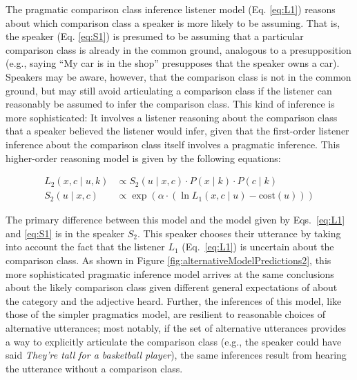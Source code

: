 \documentclass[doc]{apa6}
\begin{document}
The pragmatic comparison class inference listener model (Eq. \ref{eq:L1}) reasons about which comparison class a speaker is more likely to be assuming.
That is, the speaker (Eq. \ref{eq:S1}) is presumed to be assuming that a particular comparison class is already in the common ground, analogous to a presupposition (e.g., saying ``My car is in the shop'' presupposes that the speaker owns a car). 
Speakers may be aware, however, that the comparison class is not in the common ground, but may still avoid articulating a comparison class if the listener can reasonably be assumed to infer the comparison class. This kind of inference is more sophisticated: It involves a listener reasoning about the comparison class that a speaker believed  the listener would infer, given that the first-order listener inference about the comparison class itself involves a pragmatic inference. %
This higher-order reasoning model is given by the following equations:

\begin{align}
L_2(x, c \mid u, k) &\propto S_2(u \mid x, c) \cdot P(x \mid k) \cdot P(c \mid k) \label{eq:L2} \\
S_2(u \mid x, c) &\propto \exp{(\alpha \cdot (\ln L_{1}(x, c \mid u) - \text{cost}(u) ))}\label{eq:S2} 
\end{align}

The primary difference between this model and the model given by Eqs.~\ref{eq:L1} and \ref{eq:S1} is in the speaker $S_2$.
This speaker chooses their utterance by taking into account the fact that the listener $L_1$ (Eq.~\ref{eq:L1}) is uncertain about the comparison class. 
As shown in Figure \ref{fig:alternativeModelPredictions2}, this more sophisticated pragmatic inference model arrives at the same conclusions about the likely comparison class given different general expectations of about the category and the adjective heard.
Further, the inferences of this model, like those of the simpler pragmatics model, are resilient to reasonable choices of alternative utterances; most notably, if the set of alternative utterances provides a way to explicitly articulate the comparison class (e.g., the speaker could have said \emph{They're tall for a basketball player}), the same inferences result from hearing the utterance without a comparison class.


\end{document}

